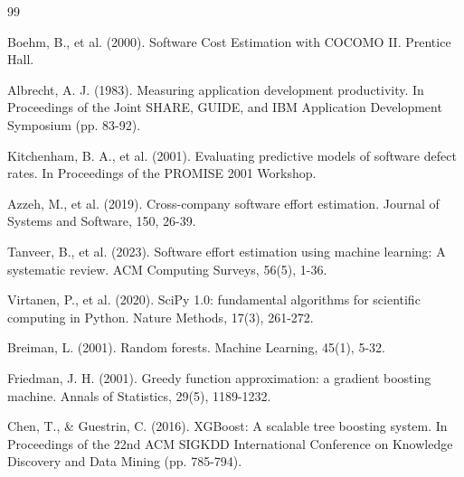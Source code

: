 \documentclass[11pt,a4paper]{article}
\begin{document}
\begin{thebibliography}{99}

 Boehm, B., et al. (2000). Software Cost Estimation with COCOMO II. Prentice Hall.

 Albrecht, A. J. (1983). Measuring application development productivity. In Proceedings of the Joint SHARE, GUIDE, and IBM Application Development Symposium (pp. 83-92).

 Kitchenham, B. A., et al. (2001). Evaluating predictive models of software defect rates. In Proceedings of the PROMISE 2001 Workshop.

 Azzeh, M., et al. (2019). Cross-company software effort estimation. Journal of Systems and Software, 150, 26-39.

 Tanveer, B., et al. (2023). Software effort estimation using machine learning: A systematic review. ACM Computing Surveys, 56(5), 1-36.

 Virtanen, P., et al. (2020). SciPy 1.0: fundamental algorithms for scientific computing in Python. Nature Methods, 17(3), 261-272.

 Breiman, L. (2001). Random forests. Machine Learning, 45(1), 5-32.

 Friedman, J. H. (2001). Greedy function approximation: a gradient boosting machine. Annals of Statistics, 29(5), 1189-1232.

 Chen, T., \& Guestrin, C. (2016). XGBoost: A scalable tree boosting system. In Proceedings of the 22nd ACM SIGKDD International Conference on Knowledge Discovery and Data Mining (pp. 785-794).

\end{thebibliography}
\end{document}

